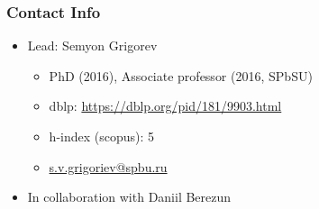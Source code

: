 \documentclass[xcolor=table,aspectratio=169]{beamer}
\begin{document}
\begin{frame}[fragile]
  \frametitle{Contact Info}  
  \begin{itemize}      
      \item Lead: Semyon Grigorev      
      \begin{itemize}
        \item PhD (2016), Associate professor (2016, SPbSU)
        \item dblp: \href{https://dblp.org/pid/181/9903.html}{https://dblp.org/pid/181/9903.html}
        \item h-index (scopus): 5
        \item \href{s.v.grigoriev@spbu.ru}{s.v.grigoriev@spbu.ru}
      \end{itemize}
      \item In collaboration with Daniil Berezun      
    \end{itemize}
\end{frame}
\end{document}
